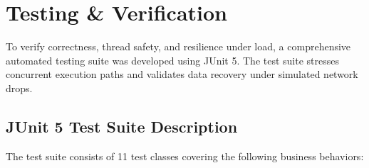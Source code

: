 
\section{Testing \& Verification}
\label{sec:testing_and_verification}

To verify correctness, thread safety, and resilience under load, a comprehensive automated testing suite was developed using JUnit 5. The test suite stresses concurrent execution paths and validates data recovery under simulated network drops.

\subsection{JUnit 5 Test Suite Description}
The test suite consists of 11 test classes covering the following business behaviors:
